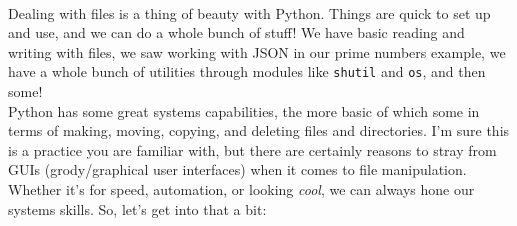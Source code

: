 \documentclass[12pt]{article}
\begin{document}
\\

Dealing with files is a thing of beauty with Python. Things are quick to set up and use, and we can do a whole bunch of stuff! We have basic reading and writing with files, we saw working with JSON in our prime numbers example, we have a whole bunch of utilities through modules like \texttt{shutil} and \texttt{os}, and then some!\\
Python has some great systems capabilities, the more basic of which some in terms of making, moving, copying, and deleting files and directories. I'm sure this is a practice you are familiar with, but there are certainly reasons to stray from GUIs (grody/graphical user interfaces) when it comes to file manipulation. Whether it's for speed, automation, or looking \textit{cool}, we can always hone our systems skills. So, let's get into that a bit:\\
\end{document}
